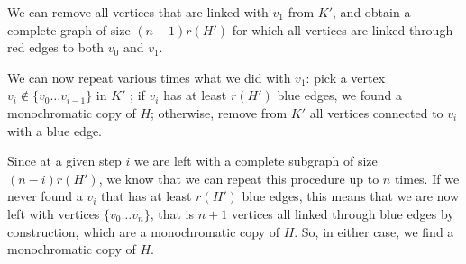 \documentclass[a4paper,german]{article}
\begin{document}
We can remove all vertices that are linked with $v_1$ from $K'$, and obtain a complete graph of
size $(n-1)r(H')$ for which all vertices are linked through red edges to both $v_0$ and $v_1$. 

We can now repeat various times what we did with $v_1$: pick a vertex $v_i \not
\in \{v_0 \ldots v_{i-1}\}$ in $K'$ ; if $v_i$ has at least $r(H')$ blue edges,
we found a monochromatic copy of $H$; otherwise, remove from $K'$ all vertices
connected to $v_i$ with a blue edge.

Since at a given step $i$ we are left with a complete subgraph
of size $(n-i)r(H')$, we know that we can repeat this procedure up to $n$
times. If we never found a $v_i$ that has at least $r(H')$ blue edges, this
means that we are now left with vertices $\{v_0 \ldots v_n \}$, that is $n+1$
vertices all linked through blue edges by construction, which are a
monochromatic copy of $H$. So, in either case, we find a monochromatic copy of
$H$.

\vspace{3em}




\end{document}
